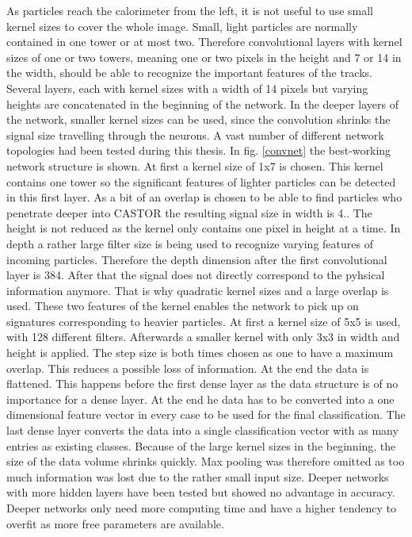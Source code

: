 As particles reach the calorimeter from the left, it is not useful to use small kernel sizes to cover the whole image. Small, light particles are normally contained in one tower or at most two. Therefore convolutional layers with kernel sizes of one or two towers, meaning one or two pixels in the height and 7 or 14 in the width, should be able to recognize the important features of the tracks. Several layers, each with kernel sizes with a width of 14 pixels but varying heights are concatenated in the beginning of the network. In the deeper layers of the network, smaller kernel sizes can be used, since the convolution shrinks the signal size travelling through the neurons. A vast number of different network topologies had been tested during this thesis. In fig. \ref{convnet} the best-working network structure is shown. At first a kernel size of 1x7 is chosen. This kernel contains one tower so the significant features of lighter particles can be detected in this first layer. As a bit of an overlap is chosen to be able to find particles who penetrate deeper into CASTOR the resulting signal size in width is 4.. The height is not reduced as the kernel only contains one pixel in height at a time. In depth a rather large filter size is being used to recognize varying features of incoming particles. Therefore the depth dimension after the first convolutional layer is 384. After that the signal does not directly correspond to the pyhsical information anymore. That is why quadratic kernel sizes and a large overlap is used. These two features of the kernel enables the network to pick up on signatures corresponding to heavier particles. At first a kernel size of 5x5  is used, with 128 different filters. Afterwards a smaller kernel with only 3x3 in width and height is applied. The step size is both times chosen as one to have a maximum overlap. This reduces a possible loss of information. At the end the data is flattened. This happens before the first dense layer as the data structure is of no importance for a dense layer. At the end he data has to be converted into a one dimensional feature vector in every case to be used for the final classification. The last dense layer converts the data into a single classification vector with as many entries as existing classes. Because of the large kernel sizes in the beginning, the size of the data volume shrinks quickly. Max pooling was therefore omitted as too much information was lost due to the rather small input size. Deeper networks with more hidden layers have been tested but showed no advantage in accuracy. Deeper networks only need more computing time and have a higher tendency to overfit as more free parameters are available. 

